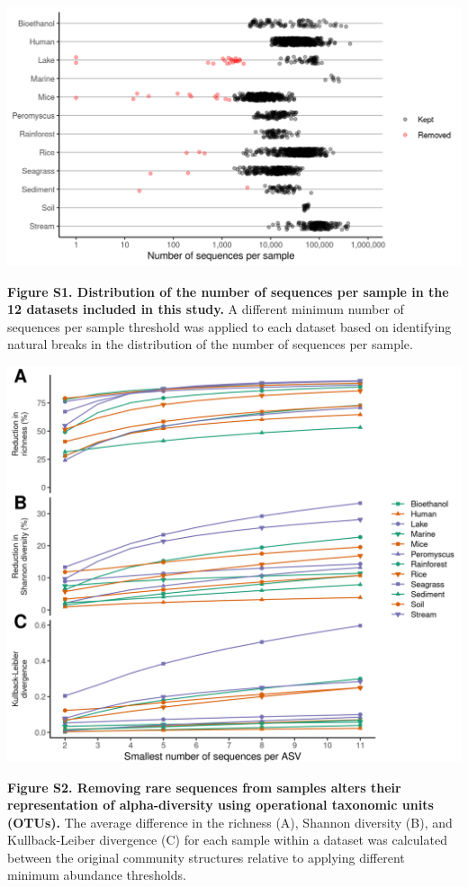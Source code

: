 \documentclass[
]{article}
\begin{document}
\newpage

\includegraphics{figure_s1.png}

\textbf{Figure S1. Distribution of the number of sequences per sample in
the 12 datasets included in this study.} A different minimum number of
sequences per sample threshold was applied to each dataset based on
identifying natural breaks in the distribution of the number of
sequences per sample.

\newpage

\includegraphics{figure_s2.png}

\textbf{Figure S2. Removing rare sequences from samples alters their
representation of alpha-diversity using operational taxonomic units
(OTUs).} The average difference in the richness (A), Shannon diversity
(B), and Kullback-Leiber divergence (C) for each sample within a dataset
was calculated between the original community structures relative to
applying different minimum abundance thresholds.
\end{document}
